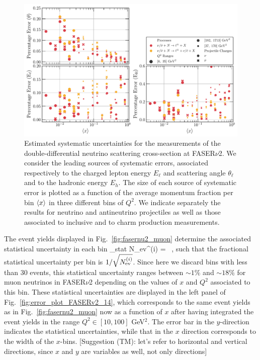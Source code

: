 \begin{figure}[!ht]
  \centering
  \includegraphics[width=\textwidth]{plots/percentage_errors.pdf}
  \caption{\small Estimated systematic uncertainties for the  measurements
    of the double-differential
    neutrino scattering cross-section at FASER$\nu$2.
    We consider the leading sources of systematic errors,
    associated respectively to the charged lepton energy $E_\ell$ and scattering angle $\theta_\ell$
    and to the hadronic energy $E_h$.
    The size of each source of systematic error is plotted as a function
    of the average momentum fraction per bin $\left\langle x\right\rangle$
    in three different bins of $Q^2$.
    We indicate separately the results for neutrino and antineutrino projectiles as well as
    those associated to inclusive and to charm production measurements.
  }
  \label{fig:percentage_uncertainties_overview}
\end{figure}

The event yields displayed in Fig.~\ref{fig:fasernu2_muon} determine the associated
statistical uncertainty in each bin
\be
\label{eq:statistical_uncertainties}
\delta_{\rm stat}  N_{\rm ev}^{(i)} =  \, ,
\ee
such that the fractional statistical uncertainty per bin is $1/\sqrt{N_{\rm ev}^{(i)}}$.
%
Since here we discard bins with less than 30 events, this statistical uncertainty
ranges between $\sim 1\%$ and $\sim 18\%$ for muon neutrinos in FASER$\nu$2 depending on the values of
$x$ and $Q^2$ associated to this bin.
%
These statistical uncertainties are displayed in the left panel
of Fig.~\ref{fig:error_plot_FASERv2_14}, which corresponds
to the same event yields as in
Fig.~\ref{fig:fasernu2_muon}
now as a function of $x$ after having integrated the event yields in the range $Q^2 \in [10,100]$ GeV$^2$.
%
The error bar in the $y$-direction indicates the statistical uncertainties, while
that in the $x$ direction corresponds to the width of the $x$-bins. {\color{red}[Suggestion (TM): let's refer to horizontal and vertical directions, since $x$ and $y$ are variables as well, not only directions]}

